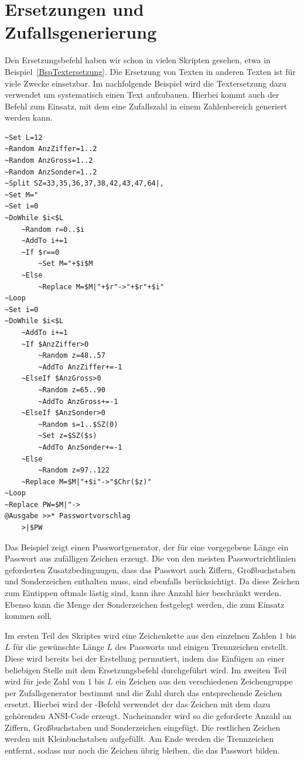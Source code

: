 \section{Ersetzungen und Zufallsgenerierung}\label{ErsetzungenUndZufallsgenerierung}
Den Ersetzungsbefehl  haben wir schon in vielen Skripten gesehen, etwa in Beispiel~\ref{BspTextersetzung}. Die Ersetzung von Texten in anderen Texten ist für viele Zwecke einsetzbar. Im nachfolgende Beispiel wird die Textersetzung dazu verwendet um systematisch einen Text aufzubauen. Hierbei kommt auch der Befehl  zum Einsatz, mit dem eine Zufallszahl in einem Zahlenbereich generiert werden kann.

\label{Passwortgenerator}
\begin{verbatim}
~Set L=12
~Random AnzZiffer=1..2
~Random AnzGross=1..2
~Random AnzSonder=1..2
~Split SZ=33,35,36,37,38,42,43,47,64|,
~Set M="
~Set i=0
~DoWhile $i<$L
    ~Random r=0..$i
    ~AddTo i+=1
    ~If $r==0
        ~Set M="+$i$M
    ~Else
        ~Replace M=$M|"+$r"->"+$r"+$i"
~Loop
~Set i=0
~DoWhile $i<$L
    ~AddTo i+=1
    ~If $AnzZiffer>0
        ~Random z=48..57
        ~AddTo AnzZiffer+=-1
    ~ElseIf $AnzGross>0
        ~Random z=65..90
        ~AddTo AnzGross+=-1
    ~ElseIf $AnzSonder>0
        ~Random s=1..$SZ(0)
        ~Set z=$SZ($s)
        ~AddTo AnzSonder+=-1
    ~Else
        ~Random z=97..122
    ~Replace M=$M|"+$i"->"$Chr($z)"
~Loop
~Replace PW=$M|"->
@Ausgabe >>* Passwortvorschlag
    >|$PW
\end{verbatim}

Das Beispiel zeigt einen Passwortgenerator, der für eine vorgegebene Länge ein Passwort aus zufälligen Zeichen erzeugt. Die von den meisten Passwortrichtlinien geforderten Zusatzbedingungen, dass das Passwort auch Ziffern, Großbuchstaben und Sonderzeichen enthalten muss, sind ebenfalls berücksichtigt. Da diese Zeichen zum Eintippen oftmals lästig sind, kann ihre Anzahl hier beschränkt werden. Ebenso kann die Menge der Sonderzeichen festgelegt werden, die zum Einsatz kommen soll.

Im ersten Teil des Skriptes wird eine Zeichenkette aus den einzelnen Zahlen $1$ bis $L$ für die gewünschte Länge $L$ des Passworts und einigen Trennzeichen erstellt. Diese wird bereits bei der Erstellung permutiert, indem das Einfügen an einer beliebigen Stelle mit dem Ersetzungsbefehl durchgeführt wird. Im zweiten Teil wird für jede Zahl von $1$ bis $L$ ein Zeichen aus den verschiedenen Zeichengruppe per Zufallsgenerator bestimmt und die Zahl durch das entsprechende Zeichen ersetzt. Hierbei wird der -Befehl verwendet der das Zeichen mit dem dazu gehörenden ANSI-Code erzeugt. Nacheinander wird so die geforderte Anzahl an Ziffern, Großbuchstaben und Sonderzeichen eingefügt. Die restlichen Zeichen werden mit Kleinbuchstaben aufgefüllt. Am Ende werden die Trennzeichen entfernt, sodass nur noch die Zeichen übrig bleiben, die das Passwort bilden.

